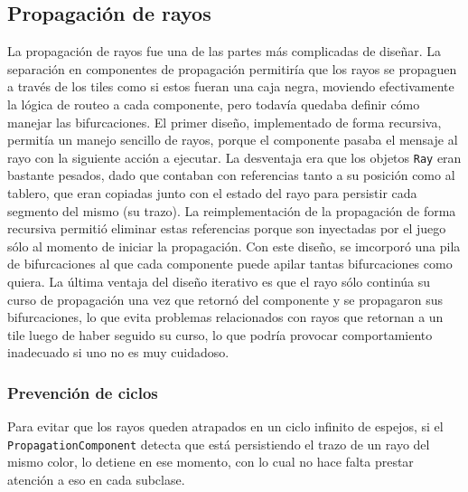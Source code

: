 \documentclass[a4paper, 11pt]{article}
\begin{document}
	\subsection{Propagación de rayos}
	La propagación de rayos fue una de las partes más complicadas de diseñar. La separación en componentes de propagación permitiría que los rayos se propaguen a través de los tiles como si estos fueran una caja negra, moviendo efectivamente la lógica de routeo a cada componente, pero todavía quedaba definir cómo manejar las bifurcaciones. El primer diseño, implementado de forma recursiva, permitía un manejo sencillo de rayos, porque el componente pasaba el mensaje al rayo con la siguiente acción a ejecutar. La desventaja era que los objetos \texttt{Ray} eran bastante pesados, dado que contaban con referencias tanto a su posición como al tablero, que eran copiadas junto con el estado del rayo para persistir cada segmento del mismo (su trazo). La reimplementación de la propagación de forma recursiva permitió eliminar estas referencias porque son inyectadas por el juego sólo al momento de iniciar la propagación. Con este diseño, se imcorporó una pila de bifurcaciones al que cada componente puede apilar tantas bifurcaciones como quiera. La última ventaja del diseño iterativo es que el rayo sólo continúa su curso de propagación una vez que retornó del componente y se propagaron sus bifurcaciones, lo que evita problemas relacionados con rayos que retornan a un tile luego de haber seguido su curso, lo que podría provocar comportamiento inadecuado si uno no es muy cuidadoso.

	\subsubsection{Prevención de ciclos}
	Para evitar que los rayos queden atrapados en un ciclo infinito de espejos, si el \texttt{PropagationComponent} detecta que está persistiendo el trazo de un rayo del mismo color, lo detiene en ese momento, con lo cual no hace falta prestar atención a eso en cada subclase.
\end{document}
